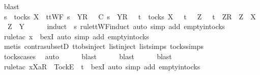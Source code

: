 \begin{isabellebody}
\ blast\isanewline
\ \ \isamarkupfalse%
\ \isamarkupfalse%
\ {\isachardoublequoteopen}s\ {\isasymin}\ tocks\ X\ {\isasymlongrightarrow}\ ttWF\ {\isacharparenleft}s\ {\isacharat}\ {\isacharbrackleft}{\isacharbrackleft}Y{\isacharbrackright}\isactrlsub R{\isacharbrackright}{\isacharparenright}\ {\isasymlongrightarrow}\ {\isasymrho}\ {\isasymlesssim}\isactrlsub C\ s\ {\isacharat}\ {\isacharbrackleft}{\isacharbrackleft}Y{\isacharbrackright}\isactrlsub R{\isacharbrackright}\ {\isasymlongrightarrow}\ {\isacharparenleft}{\isasymexists}\ t\ {\isasymin}\ tocks\ X{\isachardot}\ {\isasymrho}\ {\isacharequal}\ t\ {\isasymor}\ {\isacharparenleft}{\isasymexists}\ Z{\isachardot}\ {\isasymrho}\ {\isacharequal}\ t\ {\isacharat}\ {\isacharbrackleft}{\isacharbrackleft}Z{\isacharbrackright}\isactrlsub R{\isacharbrackright}\ {\isasymand}\ {\isacharparenleft}Z\ {\isasymsubseteq}\ X\ {\isasymor}\ Z\ {\isasymsubseteq}\ Y{\isacharparenright}{\isacharparenright}{\isacharparenright}{\isachardoublequoteclose}\isanewline
\ \ \ \ \isamarkupfalse%
\ {\isacharparenleft}induct\ {\isasymrho}\ s\ rule{\isacharcolon}ttWF{}{\isachardot}induct{\isacharcomma}\ auto\ simp\ add{\isacharcolon}\ empty{\isacharunderscore}in{\isacharunderscore}tocks{\isacharparenright}\isanewline
\ \ \ \ \isamarkupfalse%
\ {\isacharparenleft}rule{\isacharunderscore}tac\ x{\isacharequal}{\isachardoublequoteopen}{\isacharbrackleft}{\isacharbrackright}{\isachardoublequoteclose}\ \ bexI{\isacharcomma}\ auto\ simp\ add{\isacharcolon}\ empty{\isacharunderscore}in{\isacharunderscore}tocks{\isacharparenright}\isanewline
\ \ \ \ \isamarkupfalse%
\ {\isacharparenleft}metis\ contra{\isacharunderscore}subsetD\ ttobs{\isachardot}inject{\isacharparenleft}{}{\isacharparenright}\ list{\isachardot}inject\ list{\isachardot}simps{\isacharparenleft}{}{\isacharparenright}\ tocks{\isachardot}simps{\isacharparenright}\isanewline
\ \ \ \ \isamarkupfalse%
\ tocks{\isachardot}cases\ \isamarkupfalse%
\ auto\isanewline
\ \ \ \ \isamarkupfalse%
\ blast\isanewline
\ \ \ \ \isamarkupfalse%
\ blast\isanewline
\ \ \ \ \isamarkupfalse%
\ blast\isanewline
\ \ \ \ \isamarkupfalse%
\ {\isacharparenleft}rule{\isacharunderscore}tac\ x{\isacharequal}{\isachardoublequoteopen}{\isacharbrackleft}Xa{\isacharbrackright}\isactrlsub R\ {\isacharhash}\ {\isacharbrackleft}Tock{\isacharbrackright}\isactrlsub E\ {\isacharhash}\ t{\isachardoublequoteclose}\ \ bexI{\isacharcomma}\ auto\ simp\ add{\isacharcolon}\ empty{\isacharunderscore}in{\isacharunderscore}tocks{\isacharparenright}\isanewline

\end{isabellebody}
